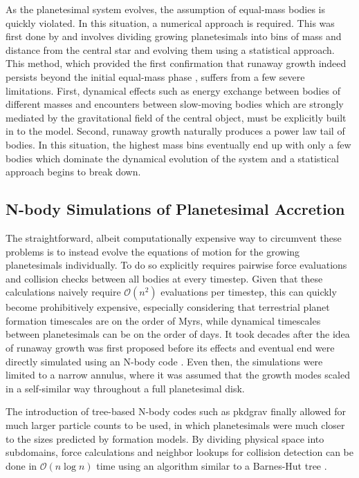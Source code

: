 As the planetesimal system evolves, the assumption of equal-mass bodies is quickly violated. In this situation, a numerical approach is required. This was first done by \cite{greenberg78} and involves dividing growing planetesimals into bins of mass and distance from the central star and evolving them using a statistical approach. This method, which provided the first confirmation that runaway growth indeed persists beyond the initial equal-mass phase \cite{wetherill89}, suffers from a few severe limitations. First, dynamical effects such as energy exchange between bodies of different masses and encounters between slow-moving bodies which are strongly mediated by the gravitational field of the central object, must be explicitly built in to the model. Second, runaway growth naturally produces a power law tail of bodies. In this situation, the highest mass bins eventually end up with only a few bodies which dominate the dynamical evolution of the system and a statistical approach begins to break down.

\subsection{N-body Simulations of Planetesimal Accretion} \label{sec:nbodyPl}

The straightforward, albeit computationally expensive way to circumvent these problems is to instead evolve the equations of motion for the growing planetesimals individually. To do so explicitly requires pairwise force evaluations and collision checks between all bodies at every timestep. Given that these calculations naively require $\mathcal{O}(n^2)$ evaluations per timestep, this can quickly become prohibitively expensive, especially considering that terrestrial planet formation timescales are on the order of Myrs, while dynamical timescales between planetesimals can be on the order of days. It took decades after the idea of runaway growth was first proposed before its effects and eventual end were directly simulated using an N-body code \cite{kokubo96, kokubo98}. Even then, the simulations were limited to a narrow annulus, where it was assumed that the growth modes scaled in a self-similar way throughout a full planetesimal disk.

The introduction of tree-based N-body codes such as {\sc pkdgrav} \cite{richardson00, stadel01, wadsley04} finally allowed for much larger particle counts to be used, in which planetesimals were much closer to the sizes predicted by formation models. By dividing physical space into subdomains, force calculations and neighbor lookups for collision detection can be done in $\mathcal{O} (n \log n)$ time using an algorithm similar to a Barnes-Hut tree \cite{barnes86}. 

